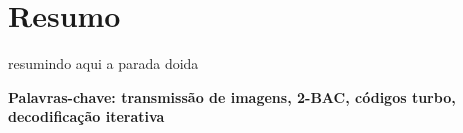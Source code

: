 \chapter*{Resumo}

resumindo aqui a parada doida



\noindent\par\vspace{1em}
\noindent\textbf{Palavras-chave: transmissão de imagens, 2-BAC, códigos turbo, decodificação iterativa} 